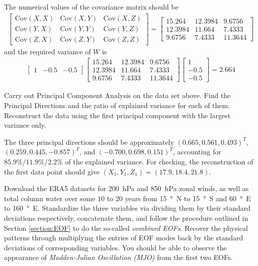 \begin{Answer}
The numerical values of the covariance matrix should be
\begin{align*}
\begin{bmatrix}
\text{Cov}(X,X) & \text{Cov}(X,Y) & \text{Cov}(X,Z) \\
\text{Cov}(Y,X) & \text{Cov}(Y,Y) & \text{Cov}(Y,Z) \\
\text{Cov}(Z,X) & \text{Cov}(Z,Y) & \text{Cov}(Z,Z)
\end{bmatrix}
=
\begin{bmatrix}
15.264 & 12.3984 & 9.6756 \\
12.3984 & 11.664 & 7.4333 \\
9.6756 & 7.4333 & 11.3644
\end{bmatrix}
\end{align*}
and the required variance of $W$ is
\begin{align*}
\begin{bmatrix}
1 & -0.5 & -0.5
\end{bmatrix}
\begin{bmatrix}
15.264 & 12.3984 & 9.6756 \\
12.3984 & 11.664 & 7.4333 \\
9.6756 & 7.4333 & 11.3644
\end{bmatrix}
\begin{bmatrix}
1 \\
-0.5 \\
-0.5
\end{bmatrix} = 2.664
\end{align*}
\end{Answer}

\begin{Exercise}
Carry out Principal Component Analysis on the data set above. Find the Principal Directions and the ratio of explained variance for each of them. Reconstruct the data using the first principal component with the largest variance only.
\end{Exercise}
\begin{Answer}
The three principal directions should be approximately $(0.665, \allowbreak 0.561, 0.493)^T$, $(0.259, 0.445, -0.857)^T$, and $(-0.700, 0.698, 0.151)^T$, accounting for $85.9\%/11.9\%/2.2\%$ of the explained variance. For checking, the reconstruction of the first data point should give $(X_1, Y_1, Z_1) = (17.9, 18.4, 21.8)$.
\end{Answer}

\begin{Exercise}
\label{ex:MJO}
Download the ERA5 datasets for \SI{200}{hPa} and \SI{850}{hPa} zonal winds, as well as total column water over some $10$ to $20$ years from \SI{15}{\degree N} to \SI{15}{\degree S} and \SI{60}{\degree E} to \SI{160}{\degree E}. Standardize the three variables via dividing them by their standard deviations respectively, concatenate them, and follow the procedure outlined in Section \ref{section:EOF} to do the so-called \textit{combined EOFs}. Recover the physical patterns through multiplying the entries of EOF modes back by the standard deviations of corresponding variables. You should be able to observe the appearance of \textit{Madden-Julian Oscillation (MJO)} from the first two EOFs. 
\end{Exercise}

